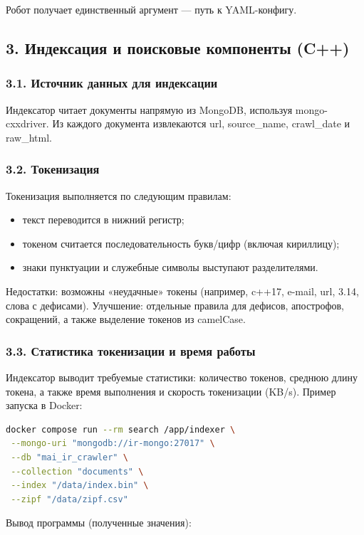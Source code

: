 \documentclass[12pt,a4paper]{article}
\begin{document}
Робот получает единственный аргумент — путь к YAML-конфигу.

\subsection*{3. Индексация и поисковые компоненты (C++)}

\subsubsection*{3.1. Источник данных для индексации}

Индексатор читает документы напрямую из MongoDB, используя mongo-cxxdriver. Из каждого документа извлекаются url, source\_name, crawl\_date и raw\_html.

\subsubsection*{3.2. Токенизация}

Токенизация выполняется по следующим правилам:

\begin{itemize}
\item текст переводится в нижний регистр;
\item токеном считается последовательность букв/цифр (включая кириллицу);
\item знаки пунктуации и служебные символы выступают разделителями.
\end{itemize}
Недостатки: возможны «неудачные» токены (например, c++17, e-mail, url, 3.14, слова с дефисами). 
\newline
Улучшение: отдельные правила для дефисов, апострофов, сокращений, а также выделение токенов из camelCase.

\subsubsection*{3.3. Статистика токенизации и время работы}

Индексатор выводит требуемые статистики: количество токенов, среднюю длину токена, а также время выполнения и скорость токенизации (KB/s). 
\newline
Пример запуска в Docker:

\begin{lstlisting}[language=bash]
docker compose run --rm search /app/indexer \
 --mongo-uri "mongodb://ir-mongo:27017" \
 --db "mai_ir_crawler" \
 --collection "documents" \
 --index "/data/index.bin" \
 --zipf "/data/zipf.csv"
\end{lstlisting}
\newline
Вывод программы (полученные значения):
\end{document}
